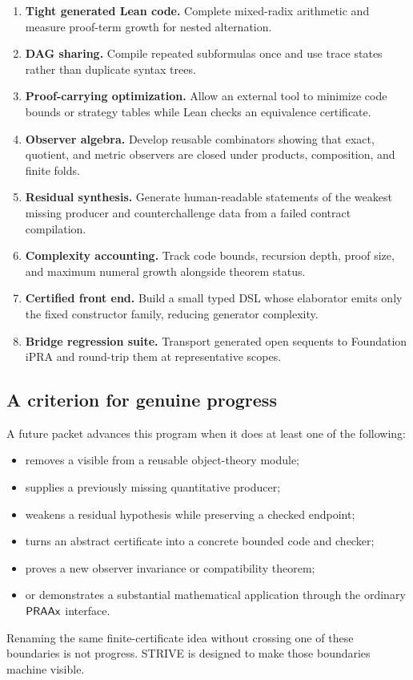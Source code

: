 \begin{enumerate}
\item \textbf{Tight generated Lean code.}  Complete mixed-radix arithmetic and
measure proof-term growth for nested alternation.
\item \textbf{DAG sharing.}  Compile repeated subformulas once and use trace
states rather than duplicate syntax trees.
\item \textbf{Proof-carrying optimization.}  Allow an external tool to minimize
code bounds or strategy tables while Lean checks an equivalence certificate.
\item \textbf{Observer algebra.}  Develop reusable combinators showing that
exact, quotient, and metric observers are closed under products, composition,
and finite folds.
\item \textbf{Residual synthesis.}  Generate human-readable statements of the
weakest missing producer and counterchallenge data from a failed contract
compilation.
\item \textbf{Complexity accounting.}  Track code bounds, recursion depth,
proof size, and maximum numeral growth alongside theorem status.
\item \textbf{Certified front end.}  Build a small typed DSL whose elaborator
emits only the fixed constructor family, reducing generator complexity.
\item \textbf{Bridge regression suite.}  Transport generated open sequents to
Foundation iPRA and round-trip them at representative scopes.
\end{enumerate}

\subsection{A criterion for genuine progress}

A future packet advances this program when it does at least one of the
following:

\begin{itemize}
\item removes a visible  from a reusable object-theory module;
\item supplies a previously missing quantitative producer;
\item weakens a residual hypothesis while preserving a checked endpoint;
\item turns an abstract certificate into a concrete bounded code and checker;
\item proves a new observer invariance or compatibility theorem;
\item or demonstrates a substantial mathematical application through the
ordinary \(\mathsf{PRAAx}\) interface.
\end{itemize}

Renaming the same finite-certificate idea without crossing one of these
boundaries is not progress.  STRIVE is designed to make those boundaries
machine visible.
